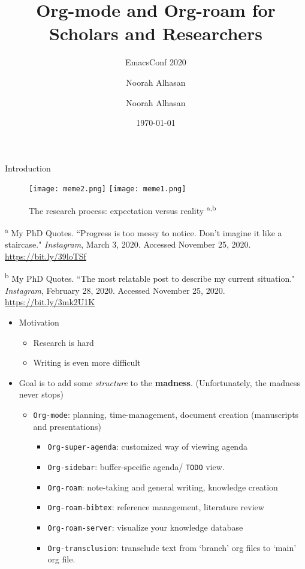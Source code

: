 \documentclass[presentation,xcolor=table]{beamer}
\subtitle{EmacsConf 2020}
\author{Noorah Alhasan}
\author{Noorah Alhasan}
\date{\today}
\title{Org-mode and Org-roam for Scholars and Researchers}
\begin{document}
\maketitle



\begin{frame}{Introduction}

 \centering
\begin{figure}
\texttt{[image: meme2.png]}
\texttt{[image: meme1.png]}
\caption{The research process: expectation versus reality \textsuperscript{a,b}}
\end{figure}

\raggedright


\scriptsize{\textsuperscript{a} My PhD Quotes. ``Progress is too messy to notice. Don't imagine it like a staircase." \textit{Instagram}, March 3, 2020. Accessed November 25, 2020. \url{https://bit.ly/39loTSf}}

\scriptsize{\textsuperscript{b} My PhD Quotes. ``The most relatable post to describe my current situation." \textit{Instagram}, February 28, 2020. Accessed November 25, 2020. \url{https://bit.ly/3mk2U1K}}

\normalsize

\framebreak

\begin{itemize}
\item Motivation
\begin{itemize}
\item Research is hard
\item Writing is even more difficult
\end{itemize}
\item Goal is to add some \emph{structure} to the \textbf{madness}. (Unfortunately, the madness never stops)
\begin{itemize}
\item \texttt{Org-mode}: planning, time-management, document creation (manuscripts and presentations)
\begin{itemize}
\item \texttt{Org-super-agenda}: customized way of viewing agenda
\item \texttt{Org-sidebar}: buffer-specific agenda/ \texttt{TODO} view.
\item \texttt{Org-roam}: note-taking and general writing, knowledge creation
\item \texttt{Org-roam-bibtex}: reference management, literature review
\item \texttt{Org-roam-server}: visualize your knowledge database
\item \texttt{Org-transclusion}: transclude text from `branch' org files to `main' org file.
\end{itemize}
\end{itemize}
\end{itemize}
\end{frame}
\end{document}
